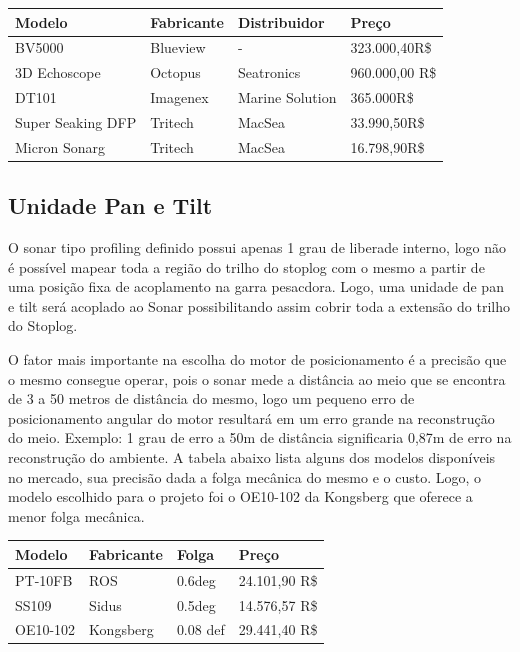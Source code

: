 \begin{center}
    \begin{tabular}{| l | l | l | l | }
    \hline
	{\bf Modelo} & 	{\bf Fabricante} &		{\bf Distribuidor}	&	{\bf Preço} \\  \hline
	BV5000 &			Blueview&				- &					323.000,40R{\$} \\  \hline
	3D Echoscope&	Octopus&		 		Seatronics&			960.000,00 R{\$} \\  \hline
	DT101&			Imagenex&			Marine Solution&	365.000R{\$} \\  \hline
	Super Seaking DFP&		Tritech&				MacSea&			33.990,50R{\$} \\ \hline
	Micron Sonarg &		Tritech&				MacSea&			16.798,90R{\$} \\ \hline

\hline 
\end{tabular}
\end{center}


\subsection{Unidade Pan e Tilt}

O sonar tipo profiling definido possui apenas 1 grau de liberade interno, logo não é possível mapear toda a região do trilho do stoplog com o mesmo a partir de uma posição fixa de acoplamento na garra pesacdora. Logo, uma unidade de pan e tilt será acoplado ao Sonar possibilitando assim cobrir toda a extensão do trilho do Stoplog. 

O fator mais importante na escolha do motor de posicionamento é a precisão que o mesmo consegue operar, pois o sonar mede a distância ao meio que se encontra de 3 a 50 metros de distância do mesmo, logo um pequeno erro de posicionamento angular do motor resultará em um erro grande na reconstrução do meio. Exemplo: 1 grau de erro a 50m de distância significaria 0,87m de erro na reconstrução do ambiente. A tabela abaixo lista alguns dos modelos disponíveis no mercado, sua precisão dada a folga mecânica do mesmo e o custo.  Logo, o modelo escolhido para o projeto foi o OE10-102 da Kongsberg que oferece a menor folga mecânica.

\begin{center}
    \begin{tabular}{| l | l | l | l | }
    \hline
	{\bf Modelo} & 	{\bf Fabricante} &		{\bf Folga}	&	{\bf Preço} \\  \hline
	PT-10FB &			ROS&				0.6deg &		24.101,90 R{\$} \\  \hline
	SS109&				Sidus&				 0.5deg&			14.576,57 R{\$} \\  \hline
	OE10-102&			Kongsberg&			0.08 def&	 		29.441,40 R{\$} \\  \hline

\hline 
\end{tabular}
\end{center}

